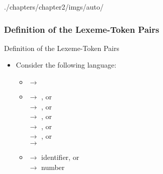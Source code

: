 \begin{graphicspathcontext}{{./chapters/chapter2/imgs/auto/}}
\begin{bibunit}[apalike]
\subsubsection{Definition of the Lexeme-Token Pairs}

\begin{frame}{Definition of the Lexeme-Token Pairs}
	\begin{itemize}
	\item Consider the following language: \begin{itemize}
		\item {} $\rightarrow$ 
		\item {} $\rightarrow$ , or \\
			 $\rightarrow$ , or \\
			 $\rightarrow$ , or \\
			 $\rightarrow$ , or \\
			 $\rightarrow$ , or \\
			 $\rightarrow$ 
		\item {} $\rightarrow$ identifier, or \\
			 $\rightarrow$ number \\
		\end{itemize}
	\end{itemize}
\end{frame}


\end{bibunit}
\end{graphicspathcontext}
